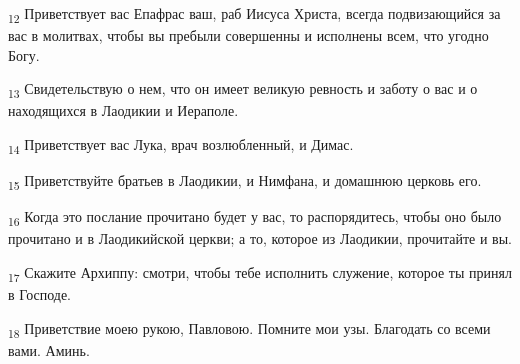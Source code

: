 \begin{tcolorbox}
\textsubscript{12} Приветствует вас Епафрас ваш, раб Иисуса Христа, всегда подвизающийся за вас в молитвах, чтобы вы пребыли совершенны и исполнены всем, что угодно Богу.
\end{tcolorbox}
\begin{tcolorbox}
\textsubscript{13} Свидетельствую о нем, что он имеет великую ревность и заботу о вас и о находящихся в Лаодикии и Иераполе.
\end{tcolorbox}
\begin{tcolorbox}
\textsubscript{14} Приветствует вас Лука, врач возлюбленный, и Димас.
\end{tcolorbox}
\begin{tcolorbox}
\textsubscript{15} Приветствуйте братьев в Лаодикии, и Нимфана, и домашнюю церковь его.
\end{tcolorbox}
\begin{tcolorbox}
\textsubscript{16} Когда это послание прочитано будет у вас, то распорядитесь, чтобы оно было прочитано и в Лаодикийской церкви; а то, которое из Лаодикии, прочитайте и вы.
\end{tcolorbox}
\begin{tcolorbox}
\textsubscript{17} Скажите Архиппу: смотри, чтобы тебе исполнить служение, которое ты принял в Господе.
\end{tcolorbox}
\begin{tcolorbox}
\textsubscript{18} Приветствие моею рукою, Павловою. Помните мои узы. Благодать со всеми вами. Аминь.
\end{tcolorbox}
